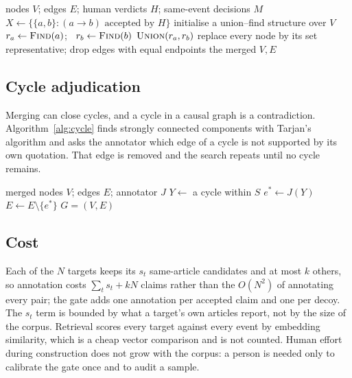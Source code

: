 \documentclass[pdflatex,sn-basic,lineno]{sn-jnl}
\theoremstyle{thmstylethree}
\theoremstyle{thmstyleone}
\begin{document}
\begin{algorithm}[!htbp]
\caption{\textsc{ConstrainedMerge}: union--find under cannot-link constraints}
\label{alg:merge}
\small
\begin{algorithmic}[1]
\Require nodes $V$; edges $E$; human verdicts $H$; same-event decisions $M$
\State $X \gets \{\{a,b\} : (a\rightarrow b)\text{ accepted by } H\}$ 
\State initialise a union--find structure over $V$
  \State $r_a\gets\textsc{Find}(a)$; \ $r_b\gets\textsc{Find}(b)$
    \State $\textsc{Union}(r_a,r_b)$
  \EndIf
\EndFor
\State replace every node by its set representative; drop edges with equal endpoints
\State \Return the merged $V, E$
\end{algorithmic}
\end{algorithm}

\subsection{Cycle adjudication}
Merging can close cycles, and a cycle in a causal graph is a contradiction. Algorithm~\ref{alg:cycle}
finds strongly connected components with Tarjan's algorithm \citep{tarjan} and asks the annotator
which edge of a cycle is not supported by its own quotation. That edge is removed and the search
repeats until no cycle remains.

\begin{algorithm}[!htbp]
\caption{\textsc{CycleAdjudication}: evidence-based cycle removal}
\label{alg:cycle}
\small
\begin{algorithmic}[1]
\Require merged nodes $V$; edges $E$; annotator $J$
  \State $Y \gets$ a cycle within $S$
  \State $e^\ast \gets J(Y)$ 
  \State $E \gets E\setminus\{e^\ast\}$
\EndWhile
\State \Return $G=(V,E)$
\end{algorithmic}
\end{algorithm}

\subsection{Cost}
Each of the $N$ targets keeps its $s_t$ same-article candidates and at most $k$ others, so
annotation costs $\sum_t s_t + kN$ claims rather than the $O(N^2)$ of annotating every pair; the
gate adds one annotation per accepted claim and one per decoy. The $s_t$ term is bounded by what a
target's own articles report, not by the size of the corpus. Retrieval scores every target against
every event by embedding similarity, which is a cheap vector comparison and is not counted.
Human effort during construction does not grow with the corpus: a person is needed only to
calibrate the gate once and to audit a sample.
\end{document}
